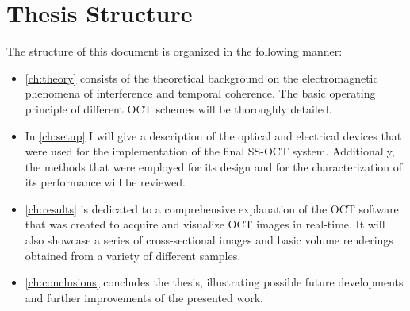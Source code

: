 \section{Thesis Structure}
The structure of this document is organized in the following manner:
\begin{itemize}
	\item \autoref{ch:theory} consists of the theoretical background on the electromagnetic phenomena of interference and temporal coherence. The basic operating principle of different OCT schemes will be thoroughly detailed. 
	\item In \autoref{ch:setup} I will give a description of the optical and electrical devices that were used for the implementation of the final SS-OCT system. Additionally, the methods that were employed for its design and for the characterization of its performance will be reviewed. 
	\item \autoref{ch:results} is dedicated to a comprehensive explanation of the OCT software that was created to acquire and visualize OCT images in real-time. It will also showcase a series of cross-sectional images and basic volume renderings obtained from a variety of different samples. 
	\item \autoref{ch:conclusions} concludes the thesis, illustrating possible future developments and further improvements of the presented work.  
\end{itemize}


% 

% 

% 

